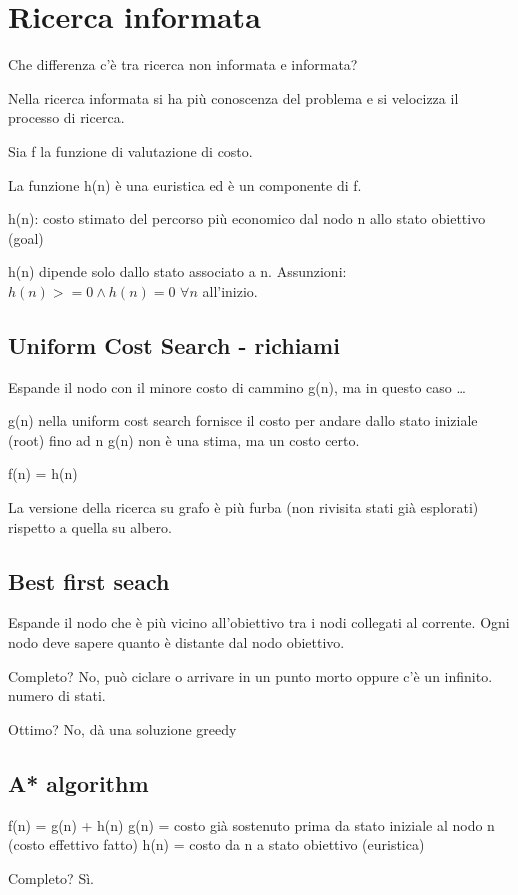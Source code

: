 \section{Ricerca informata}

Che differenza c'è tra ricerca non informata e informata?

Nella ricerca informata si ha più conoscenza del problema e si
velocizza il processo di ricerca.

Sia f la funzione di valutazione di costo.

La funzione h(n) è una euristica ed è un componente di f.

h(n): costo stimato del percorso più economico dal nodo n allo stato
obiettivo (goal)

h(n) dipende solo dallo stato associato a n.
Assunzioni: $h(n) >= 0 \land h(n) = 0$ $\forall n$ all'inizio.

\subsection{Uniform Cost Search - richiami}
Espande il nodo con il minore costo di cammino g(n), ma in questo caso \dots

g(n) nella uniform cost search fornisce il costo per andare dallo stato
iniziale (root) fino ad n g(n) non è una stima, ma un costo certo.

f(n) = h(n)

La versione della ricerca su grafo è più furba (non rivisita stati già esplorati)
rispetto a quella su albero. 

\subsection{Best first seach}
Espande il nodo che è più vicino all'obiettivo tra i nodi collegati al corrente.
Ogni nodo deve sapere quanto è distante dal nodo obiettivo.

Completo? No, può ciclare o arrivare in un punto morto oppure c'è un infinito.
numero di stati.

Ottimo? No, dà una soluzione greedy

\subsection{A* algorithm}
f(n) = g(n) + h(n)
g(n) = costo già sostenuto prima da stato iniziale al nodo n (costo effettivo fatto)
h(n) = costo da n a stato obiettivo (euristica)

Completo? Sì.

